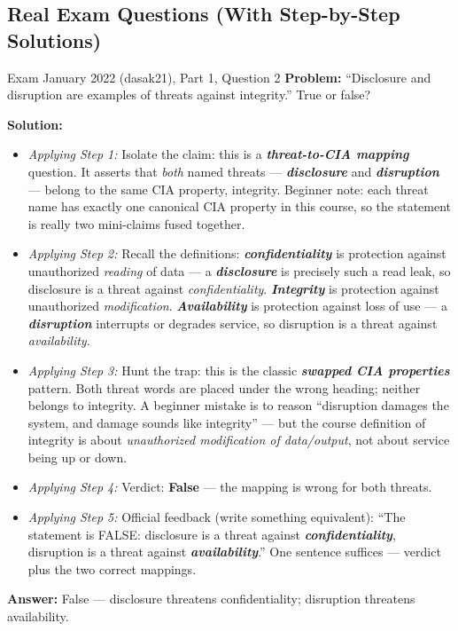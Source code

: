 \documentclass[12pt, a4paper]{article}
\newcommand{\term}[1]{\textbf{\textit{#1}}}        %
\begin{document}
\begin{itemize}
\end{itemize}

\subsection*{Real Exam Questions (With Step-by-Step Solutions)}

\begin{practicebox}{Exam January 2022 (dasak21), Part 1, Question 2}
\textbf{Problem:} ``Disclosure and disruption are examples of threats against integrity.'' True or false?

\textbf{Solution:}
\begin{itemize}
    \item \textit{Applying Step 1:} Isolate the claim: this is a \term{threat-to-CIA mapping} question. It asserts that \emph{both} named threats --- \term{disclosure} and \term{disruption} --- belong to the same CIA property, integrity. Beginner note: each threat name has exactly one canonical CIA property in this course, so the statement is really two mini-claims fused together.
    \item \textit{Applying Step 2:} Recall the definitions: \term{confidentiality} is protection against unauthorized \emph{reading} of data --- a \term{disclosure} is precisely such a read leak, so disclosure is a threat against \emph{confidentiality}. \term{Integrity} is protection against unauthorized \emph{modification}. \term{Availability} is protection against loss of use --- a \term{disruption} interrupts or degrades service, so disruption is a threat against \emph{availability}.
    \item \textit{Applying Step 3:} Hunt the trap: this is the classic \term{swapped CIA properties} pattern. Both threat words are placed under the wrong heading; neither belongs to integrity. A beginner mistake is to reason ``disruption damages the system, and damage sounds like integrity'' --- but the course definition of integrity is about \emph{unauthorized modification of data/output}, not about service being up or down.
    \item \textit{Applying Step 4:} Verdict: \textbf{False} --- the mapping is wrong for both threats.
    \item \textit{Applying Step 5:} Official feedback (write something equivalent): ``The statement is FALSE: disclosure is a threat against \term{confidentiality}, disruption is a threat against \term{availability}.'' One sentence suffices --- verdict plus the two correct mappings.
\end{itemize}
\textbf{Answer:} False --- disclosure threatens confidentiality; disruption threatens availability.
\end{practicebox}
\end{document}
